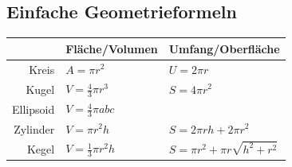 \documentclass[a4paper, fontsize = 8pt, landscape]{scrartcl}
\begin{document}
\begin{multicols*}{3}
    \subsection{Einfache Geometrieformeln}

    \begin{center}
        \renewcommand{\arraystretch}{1.5}
        \begin{tabular}{r l l} \toprule
                      & Fläche/Volumen              & Umfang/Oberfläche                      \\
            \midrule
            Kreis     & $A = \pi r^2$               & $U = 2 \pi r$                          \\
            Kugel     & $V = \frac{4}{3} \pi r^3$   & $S = 4 \pi r^2$                        \\
            Ellipsoid & $V = \frac{4}{3} \pi a b c$ &                                        \\
            Zylinder  & $V = \pi r^2 h $            & $S = 2\pi r h + 2\pi r^2$              \\
            Kegel     & $V = \frac{1}{3} \pi r^2 h$ & $S = \pi r^2 + \pi r \sqrt{h^2 + r^2}$ \\
            \bottomrule
        \end{tabular}
    \end{center}
\end{multicols*}



\setcounter{secnumdepth}{2}
\end{document}
